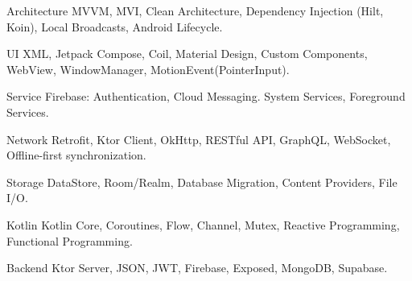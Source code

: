 \begin{cvskills}

    \cvskill
    {Architecture}
    {MVVM, MVI, Clean Architecture, Dependency Injection (Hilt, Koin), Local Broadcasts, Android Lifecycle.}

    \cvskill
    {UI}
    {XML, Jetpack Compose, Coil, Material Design, Custom Components, WebView, WindowManager, MotionEvent(PointerInput).}

    \cvskill
    {Service}
    {Firebase: Authentication, Cloud Messaging. System Services, Foreground Services.}

    \cvskill
    {Network}
    {Retrofit, Ktor Client, OkHttp, RESTful API, GraphQL, WebSocket, Offline-first synchronization.}

    \cvskill
    {Storage}
    {DataStore, Room/Realm, Database Migration, Content Providers, File I/O.}

    \cvskill
    {Kotlin}
    {Kotlin Core, Coroutines, Flow, Channel, Mutex, Reactive Programming, Functional Programming.}

    \cvskill
    {Backend}
    {Ktor Server, JSON, JWT, Firebase, Exposed, MongoDB, Supabase.}

\end{cvskills}
